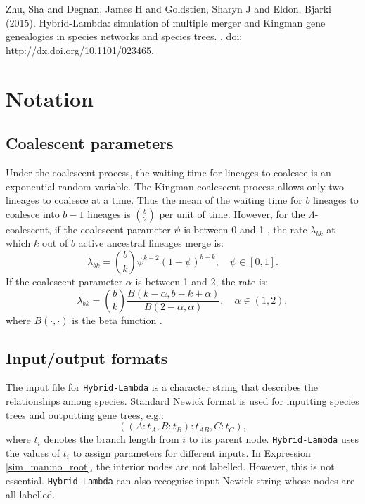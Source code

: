 \indent Zhu, Sha and Degnan, James H and Goldstien, Sharyn J and Eldon, Bjarki (2015).
\newblock Hybrid-Lambda: simulation of multiple merger and Kingman gene genealogies in species networks and species trees.
.
\newblock doi: http://dx.doi.org/10.1101/023465.

\section{Notation}
\subsection{Coalescent parameters}
Under the coalescent process, the waiting time for lineages to coalesce is an exponential random variable. The Kingman coalescent process allows only two lineages to coalesce at a time. Thus the mean of the waiting time for $b$ lineages to coalesce into $b-1$ lineages is $\binom{b}{2}$ per unit of time. However, for the $\Lambda$-coalescent, if the coalescent parameter $\psi$ is between 0 and 1 \citep{Eldon2006}, the rate $\lambda_{bk}$
at which $k$ out of $b$ active ancestral lineages merge is:
\begin{equation}
\label{sim_man:eqn:psi}
\lambda_{bk}=\binom{b}{k}\psi^{k-2}(1-\psi)^{b-k},\quad \psi \in [0,1].
\end{equation}
If the coalescent parameter $\alpha$ is between 1
and 2, the rate is:
\begin{equation}
\label{sim_man:eqn:alpha}
\lambda_{bk}=\binom{b}{k}\frac{B(k-\alpha,b-k+\alpha)}{B(2-\alpha,\alpha)}, \quad \alpha \in (1,2),
\end{equation}
where $B(\cdot,\cdot)$  is the beta function \citep{Schweinsberg2003}.

\subsection{Input/output formats}\label{sim_man:input}
The input file for {\tt Hybrid-Lambda} is a character string that describes the relationships among species. Standard Newick format \citep{Olsen1990} is used for inputting species trees and outputting
gene trees, e.g.:
\begin{equation}
((A:t_A,B:t_B):t_{AB},C:t_C)\label{sim_man:no_root},
\end{equation}
where $t_i$ denotes the branch length from $i$ to its parent node. {\tt Hybrid-Lambda} uses the values of $t_i$ to assign parameters for different inputs. In Expression \eqref{sim_man:no_root}, the interior nodes are not labelled. However, this is not essential. {\tt Hybrid-Lambda} can also recognise input Newick string whose nodes are all labelled.

